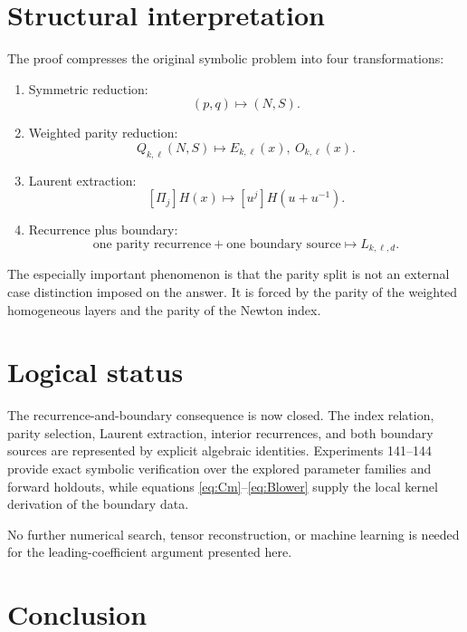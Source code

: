 \documentclass[11pt]{article}
\theoremstyle{remark}
\theoremstyle{definition}
\newcommand{\N}{N}
\newcommand{\Ssym}{S}
\newcommand{\Qkl}{Q_{k,\ell}}
\newcommand{\Lkl}{L_{k,\ell,d}}
\newcommand{\Ekl}{E_{k,\ell}}
\newcommand{\Okl}{O_{k,\ell}}
\begin{document}
\section{Structural interpretation}

The proof compresses the original symbolic problem into four transformations:
\begin{enumerate}[label=\arabic*.]
\item Symmetric reduction:
\[
(p,q)\mapsto(\N,\Ssym).
\]
\item Weighted parity reduction:
\[
\Qkl(\N,\Ssym)
\mapsto
\Ekl(x),\ \Okl(x).
\]
\item Laurent extraction:
\[
[\Pi_j]H(x)
\mapsto
[u^j]H(u+u^{-1}).
\]
\item Recurrence plus boundary:
\[
\text{one parity recurrence}
+
\text{one boundary source}
\mapsto
\Lkl.
\]
\end{enumerate}

The especially important phenomenon is that the parity split is not an
external case distinction imposed on the answer.  It is forced by the parity
of the weighted homogeneous layers and the parity of the Newton index.

\section{Logical status}

The recurrence-and-boundary consequence is now closed. The index relation,
parity selection, Laurent extraction, interior recurrences, and both boundary
sources are represented by explicit algebraic identities. Experiments
141--144 provide exact symbolic verification over the explored parameter
families and forward holdouts, while equations \eqref{eq:Cm}--\eqref{eq:Blower}
supply the local kernel derivation of the boundary data.

No further numerical search, tensor reconstruction, or machine learning is
needed for the leading-coefficient argument presented here.

\section{Conclusion}
\end{document}
